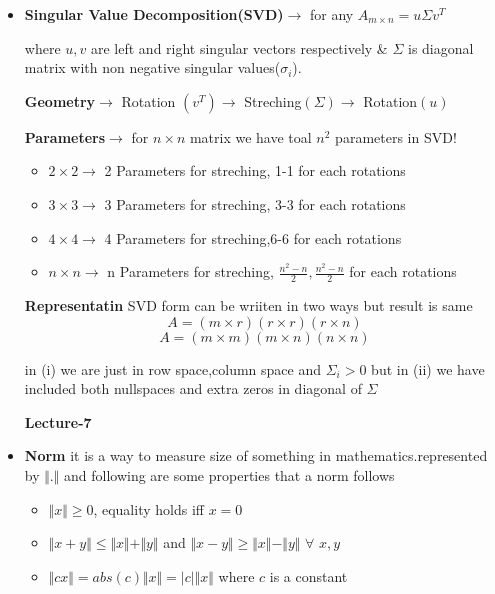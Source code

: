 \documentclass[a4paper]{article}
\numberwithin{equation}{section}
\begin{document}
\begin{itemize}
\item \textbf{Singular Value Decomposition(SVD)}$\longrightarrow$ for any $A_{m\times n}=u\Sigma v^T$

where $u,v$ are left and right singular vectors respectively \& $\Sigma$ is diagonal matrix with non negative singular values($\sigma_i$).

\textbf{Geometry$\rightarrow$} Rotation $(v^T)\rightarrow$ Streching$(\Sigma)\rightarrow$ Rotation$(u)$

\textbf{Parameters$\rightarrow$} for $n\times n$ matrix we have toal $n^2$ parameters in SVD!
\begin{itemize}
    \item $2\times 2 \rightarrow$ 2 Parameters for streching, 1-1 for each rotations
    \item $3\times 3 \rightarrow$ 3 Parameters for streching, 3-3 for each rotations
    \item $4\times 4 \rightarrow$ 4 Parameters for streching,6-6 for each rotations
    \item $n\times n \rightarrow$ n Parameters for streching, $\frac{n^2-n}{2},\frac{n^2-n}{2}$ for each rotations
\end{itemize}

\textbf{Representatin} SVD form can be wriiten in two ways but result is same
\begin{equation}
    A=(m\times r)(r\times r)(r\times n) \tag{i}
\end{equation}
\begin{equation}
    A=(m\times m)(m\times n)(n\times n) \tag{ii}
\end{equation}

in (i) we are just in row space,column space and $\Sigma_i>0$ but 
in (ii) we have included both nullspaces and extra zeros in diagonal of $\Sigma$
\begin{center}
    \textbf{\Huge{Lecture-7}}
\end{center}
\vspace{5pt}
\item \textbf{Norm} it is a way to measure size of something in mathematics.represented by $\Vert . \Vert$  and following are some properties that a norm follows
\begin{itemize}
    \item $\Vert x\Vert\geq 0$, equality holds iff $x=0$
    \item $\Vert x+y\Vert\leq \Vert x\Vert+\Vert y\Vert$ and $\Vert x-y\Vert\geq \Vert x\Vert-\Vert y\Vert$ $\forall$ $x,y$
    \item $\Vert cx\Vert=abs(c)\Vert x\Vert=\vert c\vert \Vert x\Vert$ where $c$ is a constant
\end{itemize}


\end{itemize}
\end{document}
